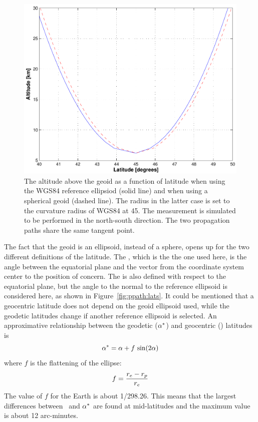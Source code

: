 \begin{figure}[!t]
 \begin{center}
  \includegraphics*[width=0.80\hsize]{Figs/ppath/wgs84_dz}
  \caption{The altitude above the geoid as a function of latitude
    when using the WGS84 reference ellipsiod (solid line) and when
    using a spherical geoid (dashed line). The radius in the latter
    case is set to the curvature radius of WGS84 at 45\degree. The
    measurement is simulated to be performed in the north-south
    direction. The two propagation paths share the same tangent
    point. }
  \label{fig:ppath:wgs84_dz}  
 \end{center}
\end{figure}


\label{sec:ppath:geolat}

The fact that the geoid is an ellipsoid, instead of a sphere, opens up
for the two different definitions of the latitude. The
, which is the the one used here, is the
angle between the equatorial plane and the vector from the coordinate
system center to the position of concern. The  is also defined with respect to the equatorial plane, but
the angle to the normal to the reference ellipsoid is considered here, as
shown in Figure~\ref{fig:ppath:lats}. It could be mentioned that a
geocentric latitude does not depend on the geoid ellipsoid used, while
the geodetic latitudes change if another reference ellipsoid is
selected. An approximative relationship between the geodetic
($\alpha^*$) and geocentric (\Lat) latitudes is \citep{montenbruck:00}
\begin{equation}
 \alpha^* = \alpha + f\,\sin(2\alpha)  
 \label{eq:ppath:lats}
\end{equation}
where $f$ is the flattening of the ellipse:
\begin{equation}
 f = \frac{r_{e}-r_{p}}{r_{e}}
 \label{eq:ppath:flattening}
\end{equation}
The value of $f$ for the Earth is about 1/298.26. This means that the
largest differences between \Lat\ and $\alpha^*$ are found at
mid-latitudes and the maximum value is about 12 arc-minutes.

